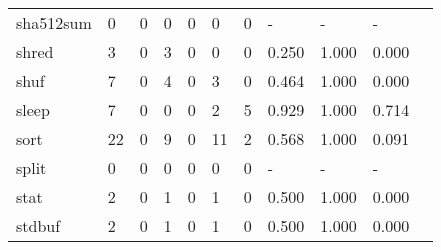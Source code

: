 \begin{longtable}{lp{1.10cm}p{1.10cm}p{1.10cm}p{1.10cm}p{1.10cm}p{1.10cm}p{1.10cm}p{1.10cm}p{1.10cm}p{1.10cm}}
sha512sum &                      0 &                                  0 &                                 0 &                                0 &                                 0 &                               0 &                              - &                                     - &                                   - \\
shred     &                      3 &                                  0 &                                 3 &                                0 &                                 0 &                               0 &                          0.250 &                                 1.000 &                               0.000 \\
shuf      &                      7 &                                  0 &                                 4 &                                0 &                                 3 &                               0 &                          0.464 &                                 1.000 &                               0.000 \\
sleep     &                      7 &                                  0 &                                 0 &                                0 &                                 2 &                               5 &                          0.929 &                                 1.000 &                               0.714 \\
sort      &                     22 &                                  0 &                                 9 &                                0 &                                11 &                               2 &                          0.568 &                                 1.000 &                               0.091 \\
split     &                      0 &                                  0 &                                 0 &                                0 &                                 0 &                               0 &                              - &                                     - &                                   - \\
stat      &                      2 &                                  0 &                                 1 &                                0 &                                 1 &                               0 &                          0.500 &                                 1.000 &                               0.000 \\
stdbuf    &                      2 &                                  0 &                                 1 &                                0 &                                 1 &                               0 &                          0.500 &                                 1.000 &                               0.000 \\

\end{longtable}
